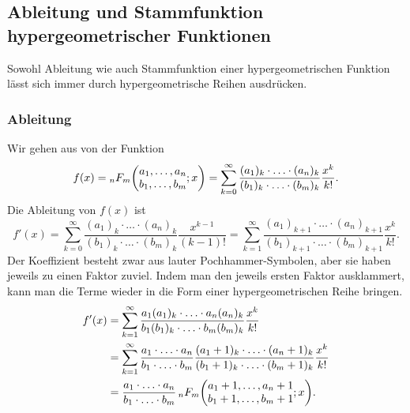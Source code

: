 %
%
\subsection{Ableitung und Stammfunktion hypergeometrischer Funktionen
\label{buch:rekursion:hypergeometrisch:stammableitung}}
Sowohl Ableitung wie auch Stammfunktion einer hypergeometrischen
Funktion lässt sich immer durch hypergeometrische Reihen ausdrücken.
%
%
\subsubsection{Ableitung}
Wir gehen aus von der Funktion
\begin{equation}
f(x)
=
\mathstrut_nF_m\biggl(
\begin{matrix}a_1,\dots,a_n\\b_1,\dots,b_m\end{matrix};
x\biggr)
=
\sum_{k=0}^\infty
\frac{
(a_1)_k\cdot\ldots\cdot(a_n)_k
}{
(b_1)_k\cdot\ldots\cdot(b_m)_k
}
\frac{x^k}{k!}.
\label{buch:rekursion:hypergeometrisch:eqn:f}
\end{equation}
Die Ableitung von $f(x)$ ist
\[
f'(x)
=
\sum_{k=0}^\infty
\frac{
(a_1)_k\cdot\ldots\cdot(a_n)_k
}{
(b_1)_k\cdot\ldots\cdot(b_m)_k
}
\frac{x^{k-1}}{(k-1)!}
=
\sum_{k=1}^\infty
\frac{
(a_1)_{k+1}\cdot\ldots\cdot(a_n)_{k+1}
}{
(b_1)_{k+1}\cdot\ldots\cdot(b_m)_{k+1}
}
\frac{x^k}{k!}.
\]
Der Koeffizient besteht zwar aus lauter Pochhammer-Symbolen, aber sie
haben jeweils zu einen Faktor zuviel.
Indem man den jeweils ersten Faktor ausklammert, kann man die
Terme wieder in die Form einer hypergeometrischen Reihe bringen.
\begin{align*}
f'(x)
&=
\sum_{k=1}^\infty
\frac{
a_1(a_1)_{k}\cdot\ldots\cdot a_n(a_n)_{k}
}{
b_1(b_1)_{k}\cdot\ldots\cdot b_m(b_m)_{k}
}
\frac{x^k}{k!}
\\
&=
\sum_{k=1}^\infty
\frac{
a_1\cdot\ldots\cdot a_n
}{
b_1\cdot\ldots\cdot b_m
}
\frac{
(a_1+1)_{k}\cdot\ldots\cdot(a_n+1)_{k}
}{
(b_1+1)_{k}\cdot\ldots\cdot(b_m+1)_{k}
}
\frac{x^k}{k!}
\\
&=
\frac{
a_1\cdot\ldots\cdot a_n
}{
b_1\cdot\ldots\cdot b_m
}
\,
\mathstrut_nF_m\biggl(
\begin{matrix}a_1+1,\dots,a_n+1\\b_1+1,\dots,b_m+1\end{matrix};
x\biggr).
\end{align*}

